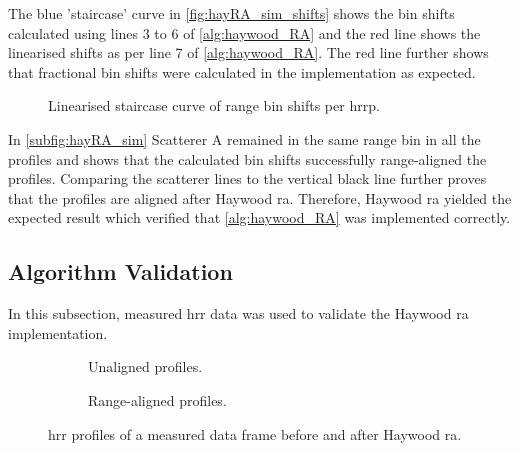 \documentclass[class=report,11pt,crop=false]{standalone}
\begin{document}
    The blue 'staircase' curve in \autoref{fig:hayRA_sim_shifts} shows the bin shifts calculated using lines 3 to 6 of \autoref{alg:haywood_RA} and the red line shows the linearised shifts as per line 7 of \autoref{alg:haywood_RA}. The red line further shows that fractional bin shifts were calculated in the implementation as expected. 

    \begin{figure}[H]
        \centering
        \resizebox{0.4\linewidth}{!}{}
        \caption{Linearised staircase curve of range bin shifts per \gls{hrrp}.\label{fig:hayRA_sim_shifts}}
    \end{figure}

    In \autoref{subfig:hayRA_sim} Scatterer A remained in the same range bin in all the profiles and shows that the calculated bin shifts successfully range-aligned the profiles. Comparing the scatterer lines to the vertical black line further proves that the profiles are aligned after Haywood \gls{ra}. Therefore, Haywood \gls{ra} yielded the expected result which verified that \autoref{alg:haywood_RA} was implemented correctly.
    
    \subsection{Algorithm Validation}
    In this subsection, measured \gls{hrr} data was used to validate the Haywood \gls{ra} implementation.
     
    \begin{figure}[H]
        \centering
        \begin{subfigure}{0.4\linewidth}
                \centering
                \resizebox{\linewidth}{!}{}
                \caption{Unaligned profiles.\label{subfig:hayRA_measured_hrrp_unaligned}}
        \end{subfigure}
        \begin{subfigure}{0.4\linewidth}
                \centering
                \resizebox{\linewidth}{!}{}
                \caption{Range-aligned profiles.\label{subfig:hayRA_measureed_hrrp}}
        \end{subfigure}
        \caption{\gls{hrr} profiles of a measured data frame before and after Haywood \gls{ra}. \label{fig:hayRA_measured}}
    \end{figure}
\end{document}
